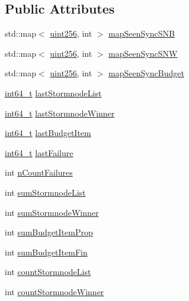\subsection*{Public Attributes}
\begin{DoxyCompactItemize}
\item 
std\+::map$<$ \hyperlink{classuint256}{uint256}, int $>$ \hyperlink{class_c_stormnode_sync_ab5874fbd02e921572983d1530cc7d69e}{map\+Seen\+Sync\+S\+N\+B}
\item 
std\+::map$<$ \hyperlink{classuint256}{uint256}, int $>$ \hyperlink{class_c_stormnode_sync_aa691249c2bfd876d49d24b82b3df7048}{map\+Seen\+Sync\+S\+N\+W}
\item 
std\+::map$<$ \hyperlink{classuint256}{uint256}, int $>$ \hyperlink{class_c_stormnode_sync_a7555b263aa695f48c81f4051c1a4788c}{map\+Seen\+Sync\+Budget}
\item 
\hyperlink{stdint_8h_adec1df1b8b51cb32b77e5b86fff46471}{int64\+\_\+t} \hyperlink{class_c_stormnode_sync_aeb0a6f0e92f6f1f25c5d9fa6c2b15bbd}{last\+Stormnode\+List}
\item 
\hyperlink{stdint_8h_adec1df1b8b51cb32b77e5b86fff46471}{int64\+\_\+t} \hyperlink{class_c_stormnode_sync_a84ac2bc44ac623f8e679f2ba58034c7a}{last\+Stormnode\+Winner}
\item 
\hyperlink{stdint_8h_adec1df1b8b51cb32b77e5b86fff46471}{int64\+\_\+t} \hyperlink{class_c_stormnode_sync_a5499eabbf28dc8ec6f77cfef1569dbb7}{last\+Budget\+Item}
\item 
\hyperlink{stdint_8h_adec1df1b8b51cb32b77e5b86fff46471}{int64\+\_\+t} \hyperlink{class_c_stormnode_sync_a8b236ed2df48f8d8fdbec1e07872f34f}{last\+Failure}
\item 
int \hyperlink{class_c_stormnode_sync_ad7944c7fc57bc0288472b1f88fbd88e6}{n\+Count\+Failures}
\item 
int \hyperlink{class_c_stormnode_sync_a3049bd8c09a2b946e99bb1ffca5ebd97}{sum\+Stormnode\+List}
\item 
int \hyperlink{class_c_stormnode_sync_a37b84e2f05256e44f9d0c80a87b26895}{sum\+Stormnode\+Winner}
\item 
int \hyperlink{class_c_stormnode_sync_a04a5e8c869c0b3802ce5ab2b8d0c7952}{sum\+Budget\+Item\+Prop}
\item 
int \hyperlink{class_c_stormnode_sync_ae54e3ff056c6bab202db68c4ceb0792e}{sum\+Budget\+Item\+Fin}
\item 
int \hyperlink{class_c_stormnode_sync_a5b480191e47be00a7b1919244b5f9714}{count\+Stormnode\+List}
\item 
int \hyperlink{class_c_stormnode_sync_ad0db06b3a1913c0c40c8e6719953d346}{count\+Stormnode\+Winner}

\end{DoxyCompactItemize}
